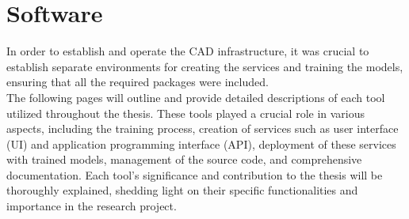 \section{Software}

In order to establish and operate the CAD infrastructure, it was crucial to establish separate environments for creating the services and training the models,
ensuring that all the required packages were included. \\

The following pages will outline and provide detailed descriptions of each tool utilized throughout the thesis.
These tools played a crucial role in various aspects,
including the training process, creation of services such as user interface (UI) and application programming interface (API),
deployment of these services with trained models,
management of the source code, and comprehensive documentation.
Each tool's significance and contribution to the thesis will be thoroughly explained,
shedding light on their specific functionalities and importance in the research project.

